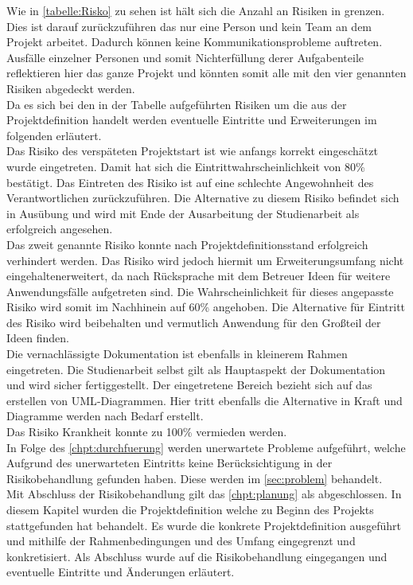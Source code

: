 Wie in \autoref{tabelle:Risko} zu sehen ist hält sich die Anzahl an Risiken in grenzen. Dies ist darauf zurückzuführen das nur eine Person und kein Team an dem Projekt arbeitet. Dadurch können keine Kommunikationsprobleme auftreten. Ausfälle einzelner Personen und somit Nichterfüllung derer Aufgabenteile reflektieren hier das ganze Projekt und könnten somit alle mit den vier genannten Risiken abgedeckt werden.\\
Da es sich bei den in der Tabelle aufgeführten Risiken um die aus der Projektdefinition handelt werden eventuelle Eintritte und Erweiterungen im folgenden erläutert.\\
Das Risiko des verspäteten Projektstart ist wie anfangs korrekt eingeschätzt wurde eingetreten. Damit hat sich die Eintrittwahrscheinlichkeit von 80\% bestätigt. Das Eintreten des Risiko ist auf eine schlechte Angewohnheit des Verantwortlichen zurückzuführen. Die Alternative zu diesem Risiko befindet sich in Ausübung und wird mit Ende der Ausarbeitung der Studienarbeit als erfolgreich angesehen.\\
Das zweit genannte Risiko konnte nach Projektdefinitionsstand erfolgreich verhindert werden. Das Risiko wird jedoch hiermit um \glqq Erweiterungsumfang nicht eingehalten\grqq erweitert, da nach Rücksprache mit dem Betreuer Ideen für weitere Anwendungsfälle aufgetreten sind. Die Wahrscheinlichkeit für dieses angepasste Risiko wird somit im Nachhinein auf 60\% angehoben. Die Alternative für Eintritt des Risiko wird beibehalten und vermutlich Anwendung für den Großteil der Ideen finden.\\
Die vernachlässigte Dokumentation ist ebenfalls in kleinerem Rahmen eingetreten. Die Studienarbeit selbst gilt als Hauptaspekt der Dokumentation und wird sicher fertiggestellt. Der eingetretene Bereich bezieht sich auf das erstellen von \ac{UML}-Diagrammen. Hier tritt ebenfalls die Alternative in Kraft und Diagramme werden nach Bedarf erstellt.\\
Das Risiko Krankheit konnte zu 100\% vermieden werden.\\
In Folge des \autoref{chpt:durchfuerung}  werden unerwartete Probleme aufgeführt, welche Aufgrund des unerwarteten Eintritts keine Berücksichtigung in der Risikobehandlung gefunden haben. Diese werden im \autoref{sec:problem}  behandelt.\\

Mit Abschluss der Risikobehandlung gilt das \autoref{chpt:planung}  als abgeschlossen. In diesem Kapitel wurden die Projektdefinition welche zu Beginn des Projekts stattgefunden hat behandelt. Es wurde die konkrete Projektdefinition ausgeführt und mithilfe der Rahmenbedingungen und des Umfang eingegrenzt und konkretisiert. Als Abschluss wurde auf die Risikobehandlung eingegangen und eventuelle Eintritte und Änderungen erläutert.